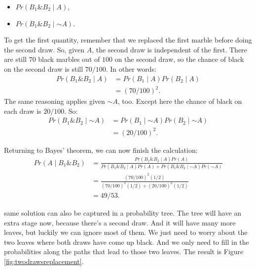 \documentclass[justified]{tufte-book}
\providecommand{\tightlist}{%
  \setlength{\itemsep}{0pt}\setlength{\parskip}{0pt}}
\newcommand{\given}{\mid}
\renewcommand{\neg}{\mathbin{\sim}}
\renewcommand{\wedge}{\mathbin{\&}}
\newcommand{\p}{Pr}
\theoremstyle{definition}
\theoremstyle{definition}
\theoremstyle{definition}
\theoremstyle{remark}
\begin{document}
\begin{itemize}
\tightlist
\item
  \(\p(B_1 \wedge B_2 \given A)\),
\item
  \(\p(B_1 \wedge B_2 \given \neg A)\).
\end{itemize}

To get the first quantity, remember that we replaced the first marble
before doing the second draw. So, given \(A\), the second draw is
independent of the first. There are still \(70\) black marbles out of
\(100\) on the second draw, so the chance of black on the second draw is
still \(70/100\). In other words: \[
  \begin{aligned}
    \p(B_1 \wedge B_2 \given A) &= \p(B_1 \given A) \p(B_2 \given A)\\
      &= (70/100)^2.
  \end{aligned}
\] The same reasoning applies given \(\neg A\), too. Except here the
chance of black on each draw is \(20/100\). So: \[
  \begin{aligned}
    \p(B_1 \wedge B_2 \given \neg A) &= \p(B_1 \given \neg A) \p(B_2 \given \neg A)\\
      &= (20/100)^2.
  \end{aligned}
\]

Returning to Bayes' theorem, we can now finish the calculation: \[
  \begin{aligned}
    \p(A \given B_1 \wedge B_2) &= \frac{\p(B_1 \wedge B_2 \given A)\p(A)}{\p(B_1 \wedge B_2 \given A) \p(A) + \p(B_1 \wedge B_2 \given \neg A) \p(\neg A)} \\ 
    &= \frac{(70/100)^2(1/2)}{(70/100)^2(1/2) + (20/100)^2(1/2)}\\
    &= 49/53.
  \end{aligned}
\]

 same solution can also be captured in a probability
tree. The tree will have an extra stage now, because there's a second
draw. And it will have many more leaves, but luckily we can ignore most
of them. We just need to worry about the two leaves where both draws
have come up black. And we only need to fill in the probabilities along
the paths that lead to those two leaves. The result is Figure
\ref{fig:twodrawsreplacement}.
\end{document}
